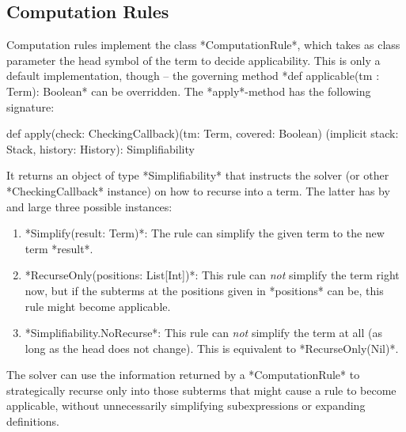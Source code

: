 \subsection{Computation Rules}\label{sec:lf:lfx:rules:computation}
Computation rules implement the class *ComputationRule*, which takes as class parameter the head symbol of the term to decide applicability. This is only a default implementation, though -- the governing method *def applicable(tm : Term): Boolean* can be overridden. The *apply*-method has the following signature:
\begin{scalacode}
def apply(check: CheckingCallback)(tm: Term, covered: Boolean)
	(implicit stack: Stack, history: History): Simplifiability
\end{scalacode}
It returns an object of type *Simplifiability* that instructs the solver (or other *CheckingCallback* instance) on how to recurse into a term. The latter has by and large three possible instances:
\begin{enumerate}
	\item *Simplify(result: Term)*: The rule can simplify the given term to the new term *result*.
	\item *RecurseOnly(positions: List[Int])*: This rule can \emph{not} simplify the term right now, but if the subterms at the positions given in *positions* can be, this rule might become applicable.
	\item *Simplifiability.NoRecurse*: This rule can \emph{not} simplify the term at all (as long as the head does not change). This is equivalent to *RecurseOnly(Nil)*.
\end{enumerate}
The solver can use the information returned by a *ComputationRule* to strategically recurse only into those subterms that might cause a rule to become applicable, without unnecessarily simplifying subexpressions or expanding definitions.

